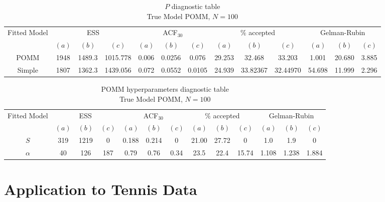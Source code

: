 \documentclass[11pt]{amsart}
\begin{document}
\begin{table}[htbp]
\centering
\caption*{
{\large $P$ diagnostic table} \\ 
{\small True Model POMM, $N=100$}
} 
\begin{tabular}{ccccccccccccc}
\toprule
\multirow{2}{*}{Fitted Model} & \multicolumn{3}{c}{ESS} & \multicolumn{3}{c}{
ACF$_{30}$} & \multicolumn{3}{c}{$\%$ accepted} & \multicolumn{3}{c}{Gelman-Rubin}\\
\cmidrule(lr){2-4} \cmidrule(lr){5-7} \cmidrule(lr){8-10} \cmidrule(lr){11-13} 
& $(a)$ & $(b)$ & $(c)$ & $(a)$ & $(b)$ & $(c)$ & $(a)$ & $(b)$ & $(c)$ & $(a)$ & $(b)$ & $(c)$ \\
\midrule
POMM &1948 & 1489.3 & 1015.778 & 0.006& 0.0256 & 0.076 & 29.253 & 32.468 & 33.203& 1.001 & 20.680 & 3.885   \\
Simple &1807 & 1362.3 & 1439.056 & 0.072& 0.0552 & 0.0105&24.939 & 33.82367 & 32.44970& 54.698 & 11.999 & 2.296  \\
\bottomrule
\end{tabular}
\label{table:simulations_from_simple}
\end{table}


\begin{table}[htbp]
\centering
\caption*{
{\large POMM hyperparameters diagnostic table} \\ 
{\small True Model POMM, $N=100$}
} 
\begin{tabular}{ccccccccccccc}
\toprule
\multirow{2}{*}{Fitted Model} & \multicolumn{3}{c}{ESS} & \multicolumn{3}{c}{
ACF$_{30}$} & \multicolumn{3}{c}{$\%$ accepted} & \multicolumn{3}{c}{Gelman-Rubin}\\
\cmidrule(lr){2-4} \cmidrule(lr){5-7} \cmidrule(lr){8-10} \cmidrule(lr){11-13} 
& $(a)$ & $(b)$ & $(c)$ & $(a)$ & $(b)$ & $(c)$ & $(a)$ & $(b)$ & $(c)$ & $(a)$ & $(b)$ & $(c)$ \\
\midrule
$S$ &319 & 1219 & 0 & 0.188 & 0.214 & 0 & 21.00 & 27.72 & 0 & 1.0 & 1.9 & 0 \\
$\alpha$ &40 & 126 & 187 & 0.79 & 0.76 & 0.34 & 23.5 & 22.4 & 15.74 & 1.108 & 1.238 & 1.884   \\
\bottomrule
\end{tabular}
\label{table:simulations_from_simple}
\end{table}






\clearpage

\section{Application to Tennis Data}
\end{document}
